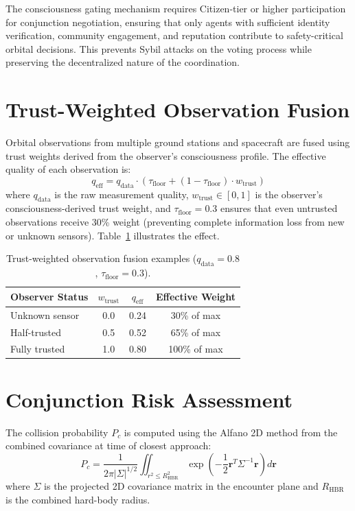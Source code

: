\documentclass[12pt]{book}
\begin{document}
The consciousness gating mechanism requires Citizen-tier or higher participation for conjunction negotiation, ensuring that only agents with sufficient identity verification, community engagement, and reputation contribute to safety-critical orbital decisions. This prevents Sybil attacks on the voting process while preserving the decentralized nature of the coordination.

\section{Trust-Weighted Observation Fusion}

Orbital observations from multiple ground stations and spacecraft are fused using trust weights derived from the observer's consciousness profile. The effective quality of each observation is:
\begin{equation}\label{eq:trust-fusion}
q_{\text{eff}} = q_{\text{data}} \cdot \left(\tau_{\text{floor}} + (1 - \tau_{\text{floor}}) \cdot w_{\text{trust}}\right)
\end{equation}
where $q_{\text{data}}$ is the raw measurement quality, $w_{\text{trust}} \in [0, 1]$ is the observer's consciousness-derived trust weight, and $\tau_{\text{floor}} = 0.3$ ensures that even untrusted observations receive 30\% weight (preventing complete information loss from new or unknown sensors). Table~\ref{tab:trust-fusion} illustrates the effect.

\begin{table}[H]
\centering
\caption{Trust-weighted observation fusion examples ($q_{\text{data}} = 0.8$, $\tau_{\text{floor}} = 0.3$).}
\label{tab:trust-fusion}
\begin{tabular}{lccc}
\toprule
\textbf{Observer Status} & \textbf{$w_{\text{trust}}$} & \textbf{$q_{\text{eff}}$} & \textbf{Effective Weight} \\
\midrule
Unknown sensor & 0.0 & 0.24 & 30\% of max \\
Half-trusted & 0.5 & 0.52 & 65\% of max \\
Fully trusted & 1.0 & 0.80 & 100\% of max \\
\bottomrule
\end{tabular}
\end{table}

\section{Conjunction Risk Assessment}

The collision probability $P_c$ is computed using the Alfano 2D method from the combined covariance at time of closest approach:
\begin{equation}
P_c = \frac{1}{2\pi|\Sigma|^{1/2}} \iint_{r^2 \leq R_{\text{HBR}}^2} \exp\left(-\frac{1}{2}\mathbf{r}^T \Sigma^{-1} \mathbf{r}\right) d\mathbf{r}
\end{equation}
where $\Sigma$ is the projected 2D covariance matrix in the encounter plane and $R_{\text{HBR}}$ is the combined hard-body radius.
\end{document}
